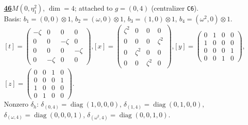 \begin{samepage}\noindent\textbf{\underline{46}}\quad $M(0,\eta^{2}_{1})$, $\dim=4$; attached to $g=(0,4)$ (centralizer \texttt{C6}).\\
Basis: $b_{1}=(0,0)\otimes 1$, $b_{2}=(\omega,0)\otimes 1$, $b_{3}=(1,0)\otimes 1$, $b_{4}=(\omega^2,0)\otimes 1$.\\
$[t]=\left(\begin{smallmatrix} -\zeta & 0 & 0 & 0 \\ 0 & 0 & -\zeta & 0 \\ 0 & 0 & 0 & -\zeta \\ 0 & -\zeta & 0 & 0 \end{smallmatrix}\right)$,\quad $[x]=\left(\begin{smallmatrix} \zeta^2 & 0 & 0 & 0 \\ 0 & 0 & 0 & \zeta^2 \\ 0 & \zeta^2 & 0 & 0 \\ 0 & 0 & \zeta^2 & 0 \end{smallmatrix}\right)$,\quad $[y]=\left(\begin{smallmatrix} 0 & 1 & 0 & 0 \\ 1 & 0 & 0 & 0 \\ 0 & 0 & 0 & 1 \\ 0 & 0 & 1 & 0 \end{smallmatrix}\right)$,\quad $[z]=\left(\begin{smallmatrix} 0 & 0 & 1 & 0 \\ 0 & 0 & 0 & 1 \\ 1 & 0 & 0 & 0 \\ 0 & 1 & 0 & 0 \end{smallmatrix}\right)$.\\
Nonzero $\delta_h$: $\delta_{(0,4)}=\operatorname{diag}(1,0,0,0)$, $\delta_{(1,4)}=\operatorname{diag}(0,1,0,0)$, $\delta_{(\omega,4)}=\operatorname{diag}(0,0,0,1)$, $\delta_{(\omega^2,4)}=\operatorname{diag}(0,0,1,0)$.\end{samepage}
\medskip

